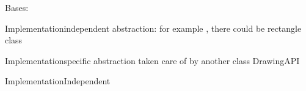 \documentclass[letterpaper,10pt,english]{sphinxmanual}
\begin{document}
\begin{fulllineitems}
\label{\detokenize{StructuralPattern:StructuralPattern.bridge.Circle}}
\pysigstartsignatures
{}
\pysigstopsignatures
\sphinxAtStartPar
Bases: 

\sphinxAtStartPar
Implementation\sphinxhyphen{}independent abstraction: for example , there could be rectangle class

\begin{fulllineitems}
\label{\detokenize{StructuralPattern:StructuralPattern.bridge.Circle.draw}}
\pysigstartsignatures
{}
\pysigstopsignatures
\sphinxAtStartPar
Implementation\sphinxhyphen{}specific abstraction taken care of by another class DrawingAPI

\end{fulllineitems}


\begin{fulllineitems}
\label{\detokenize{StructuralPattern:StructuralPattern.bridge.Circle.scale}}
\pysigstartsignatures
{}
\pysigstopsignatures
\sphinxAtStartPar
Implementation\sphinxhyphen{}Independent

\end{fulllineitems}


\end{fulllineitems}

\end{document}
